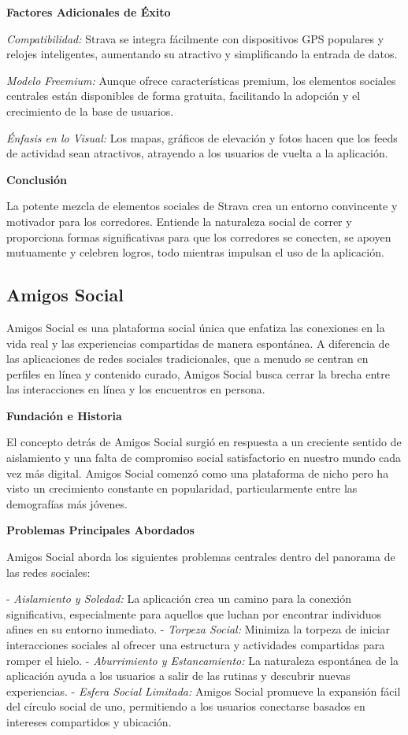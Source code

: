 \textbf{Factores Adicionales de Éxito}

\textit{Compatibilidad:} Strava se integra fácilmente con dispositivos GPS populares y relojes inteligentes, aumentando su atractivo y simplificando la entrada de datos.

\textit{Modelo Freemium:} Aunque ofrece características premium, los elementos sociales centrales están disponibles de forma gratuita, facilitando la adopción y el crecimiento de la base de usuarios.

\textit{Énfasis en lo Visual:} Los mapas, gráficos de elevación y fotos hacen que los feeds de actividad sean atractivos, atrayendo a los usuarios de vuelta a la aplicación.

\textbf{Conclusión}

La potente mezcla de elementos sociales de Strava crea un entorno convincente y motivador para los corredores. Entiende la naturaleza social de correr y proporciona formas significativas para que los corredores se conecten, se apoyen mutuamente y celebren logros, todo mientras impulsan el uso de la aplicación.




\subsection{Amigos Social}
Amigos Social es una plataforma social única que enfatiza las conexiones en la vida real y las experiencias compartidas de manera espontánea. A diferencia de las aplicaciones de redes sociales tradicionales, que a menudo se centran en perfiles en línea y contenido curado, Amigos Social busca cerrar la brecha entre las interacciones en línea y los encuentros en persona.

\textbf{Fundación e Historia}

El concepto detrás de Amigos Social surgió en respuesta a un creciente sentido de aislamiento y una falta de compromiso social satisfactorio en nuestro mundo cada vez más digital. Amigos Social comenzó como una plataforma de nicho pero ha visto un crecimiento constante en popularidad, particularmente entre las demografías más jóvenes.

\textbf{Problemas Principales Abordados}

Amigos Social aborda los siguientes problemas centrales dentro del panorama de las redes sociales:

- \textit{Aislamiento y Soledad:} La aplicación crea un camino para la conexión significativa, especialmente para aquellos que luchan por encontrar individuos afines en su entorno inmediato.
- \textit{Torpeza Social:} Minimiza la torpeza de iniciar interacciones sociales al ofrecer una estructura y actividades compartidas para romper el hielo.
- \textit{Aburrimiento y Estancamiento:} La naturaleza espontánea de la aplicación ayuda a los usuarios a salir de las rutinas y descubrir nuevas experiencias.
- \textit{Esfera Social Limitada:} Amigos Social promueve la expansión fácil del círculo social de uno, permitiendo a los usuarios conectarse basados en intereses compartidos y ubicación.

